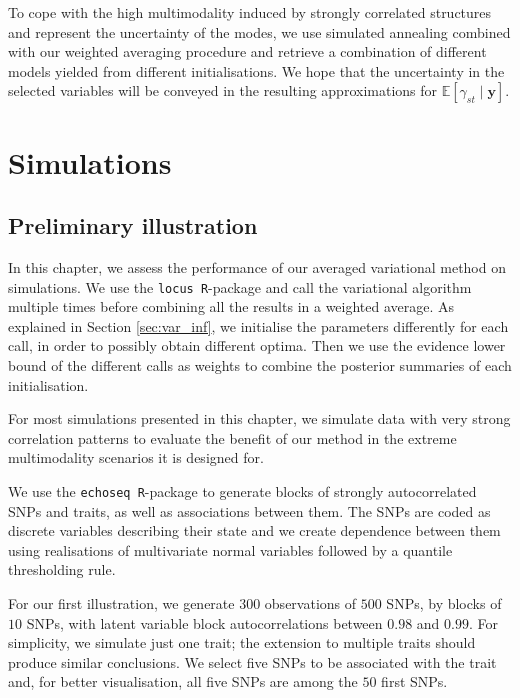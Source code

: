 \documentclass[a4paper, 11pt]{report}
\numberwithin{equation}{chapter}
\begin{document}
To cope with the high multimodality induced by strongly correlated structures and represent the uncertainty of the modes, we use simulated annealing combined with our weighted averaging procedure and retrieve a combination of different models yielded from different initialisations. We hope that the uncertainty in the selected variables will be conveyed in the resulting approximations for $\mathbb{E}\left[\gamma_{st}\mid \boldsymbol{y}\right]$.

\newpage
\chapter{Simulations} \label{chap:sim}
\section{Preliminary illustration}
In this chapter, we assess the performance of our averaged variational method on simulations. We use the \texttt{locus R}-package \citep{r_locus} and call the variational algorithm multiple times before combining all the results in a weighted average. As explained in Section \ref{sec:var_inf}, we initialise the parameters differently for each call, in order to possibly obtain different optima. Then we use the evidence lower bound of the different calls as weights to combine the posterior summaries of each initialisation. 

For most simulations presented in this chapter, we simulate data with very strong correlation patterns to evaluate the benefit of our method in the extreme multimodality scenarios it is designed for.

We use the \texttt{echoseq R}-package \citep{r_echoseq} to generate blocks of strongly autocorrelated SNPs and traits, as well as associations between them. The SNPs are coded as discrete variables describing their state and we create dependence between them using realisations of multivariate normal variables followed by a quantile thresholding rule.

For our first illustration, we generate $300$ observations of $500$ SNPs, by blocks of $10$ SNPs, with latent variable block autocorrelations between $0.98$ and $0.99$. For simplicity, we simulate just one trait; the extension to multiple traits should produce similar conclusions. We select five SNPs to be associated with the trait and, for better visualisation, all five SNPs are among the $50$ first SNPs.
\end{document}
